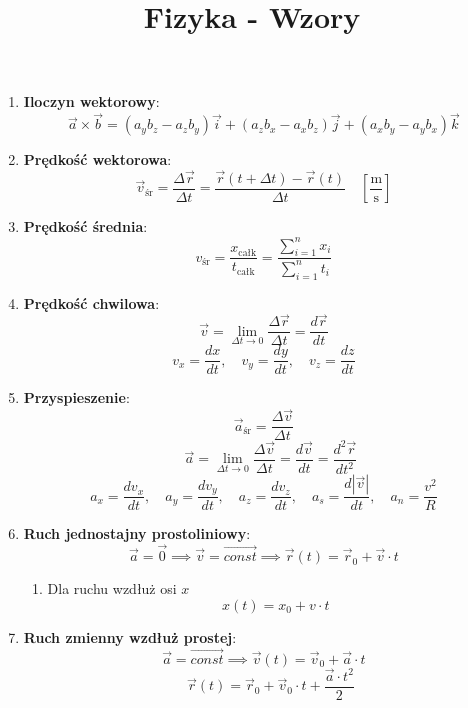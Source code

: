 \documentclass{article}
\author{}
\title{Fizyka - Wzory}
\date{}
\begin{document}
	\maketitle
	
	\begin{enumerate}
		
		\item \textbf{Iloczyn wektorowy}:
		\[
		\vec{a} \times \vec{b} = (a_yb_z - a_zb_y)\vec{i} + (a_zb_x - a_xb_z)\vec{j} + (a_xb_y - a_yb_x)\vec{k}
		\]
		
		\item \textbf{Prędkość wektorowa}:
		\[
		\vec{v}_\text{śr} = \frac{\Delta\vec{r}}{\Delta t} = \frac{\vec{r}(t + \Delta t) - \vec{r}(t)}{\Delta t} \quad \left[\frac{\text{m}}{\text{s}}\right]
		\]
		
		\item \textbf{Prędkość średnia}:
		\[
		v_\text{śr} = \frac{x_\text{całk}}{t_\text{całk}} = \frac{\sum \limits_{i=1}^{n}x_i}{\sum \limits_{i=1}^{n}t_i}
		\]
		
		\item \textbf{Prędkość chwilowa}:
		\[
		\vec{v} = \lim_{\Delta t \to 0} \frac{\Delta \vec{r}}{\Delta t} = \frac{d \vec{r}}{dt}
		\]
		\[
		v_x = \frac{dx}{dt}, \quad v_y = \frac{dy}{dt}, \quad v_z = \frac{dz}{dt}
		\]
		
		\item \textbf{Przyspieszenie}:
		\[
		\vec{a}_\text{śr} = \frac{\Delta \vec{v}}{\Delta t}
		\]
		\[
		\quad 
		\vec{a} = \lim_{\Delta t \to 0} \frac{\Delta \vec{v}}{\Delta t} = \frac{d \vec{v}}{dt} = \frac{d^2 \vec{r}}{dt^2}
		\]
		\[
		a_x = \frac{dv_x}{dt}, \quad a_y = \frac{dv_y}{dt}, \quad a_z = \frac{dv_z}{dt}, \quad a_s = \frac{d|\vec{v}|}{dt}, \quad a_n = \frac{v^2}{R}
		\]
		
		\item \textbf{Ruch jednostajny prostoliniowy}:
			\[
			\vec{a} = \vec{0} \implies \vec{v} = \overrightarrow{const} \implies \vec{r}(t) = \vec{r}_0 + \vec{v} \cdot t
			\]
			\begin{enumerate}
				\item Dla ruchu wzdłuż osi \(x\)
				\[
				x(t) = x_0 + v \cdot t
				\]
		\end{enumerate}
		
		\item \textbf{Ruch zmienny wzdłuż prostej}:
		\[
		\vec{a} = \overrightarrow{const} \implies \vec{v}(t) = \vec{v}_0 + \vec{a} \cdot t
		\]
		\[\quad \vec{r}(t) = \vec{r}_0 + \vec{v}_0 \cdot t + \frac{\vec{a} \cdot t^2}{2}
		\]
		

\end{enumerate}
\end{document}
